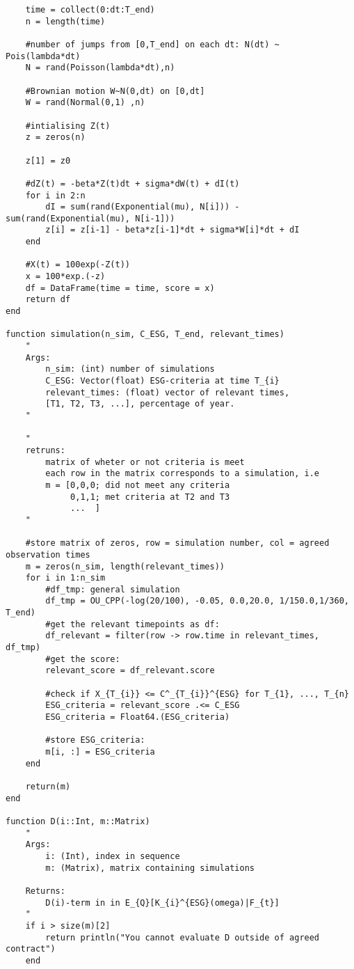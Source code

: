 \begin{verbatim}
    time = collect(0:dt:T_end) 
    n = length(time)

    #number of jumps from [0,T_end] on each dt: N(dt) ~ Pois(lambda*dt)
    N = rand(Poisson(lambda*dt),n) 

    #Brownian motion W~N(0,dt) on [0,dt]
    W = rand(Normal(0,1) ,n)

    #intialising Z(t)
    z = zeros(n)

    z[1] = z0

    #dZ(t) = -beta*Z(t)dt + sigma*dW(t) + dI(t)
    for i in 2:n 
        dI = sum(rand(Exponential(mu), N[i])) - sum(rand(Exponential(mu), N[i-1]))
        z[i] = z[i-1] - beta*z[i-1]*dt + sigma*W[i]*dt + dI
    end

    #X(t) = 100exp(-Z(t))
    x = 100*exp.(-z)
    df = DataFrame(time = time, score = x)
    return df
end

function simulation(n_sim, C_ESG, T_end, relevant_times)
    "
    Args:
        n_sim: (int) number of simulations 
        C_ESG: Vector(float) ESG-criteria at time T_{i}            
        relevant_times: (float) vector of relevant times, 
        [T1, T2, T3, ...], percentage of year.
    "

    "
    retruns:
        matrix of wheter or not criteria is meet
        each row in the matrix corresponds to a simulation, i.e
        m = [0,0,0; did not meet any criteria
             0,1,1; met criteria at T2 and T3
             ...  ] 
    "
    
    #store matrix of zeros, row = simulation number, col = agreed observation times
    m = zeros(n_sim, length(relevant_times))
    for i in 1:n_sim
        #df_tmp: general simulation 
        df_tmp = OU_CPP(-log(20/100), -0.05, 0.0,20.0, 1/150.0,1/360, T_end)
        #get the relevant timepoints as df:
        df_relevant = filter(row -> row.time in relevant_times, df_tmp)
        #get the score:
        relevant_score = df_relevant.score
    
        #check if X_{T_{i}} <= C^_{T_{i}}^{ESG} for T_{1}, ..., T_{n}
        ESG_criteria = relevant_score .<= C_ESG 
        ESG_criteria = Float64.(ESG_criteria)
        
        #store ESG_criteria:
        m[i, :] = ESG_criteria
    end

    return(m)
end

function D(i::Int, m::Matrix)
    " 
    Args:
        i: (Int), index in sequence 
        m: (Matrix), matrix containing simulations

    Returns: 
        D(i)-term in in E_{Q}[K_{i}^{ESG}(omega)|F_{t}]    
    "
    if i > size(m)[2]
        return println("You cannot evaluate D outside of agreed contract")
    end
    

\end{verbatim}
